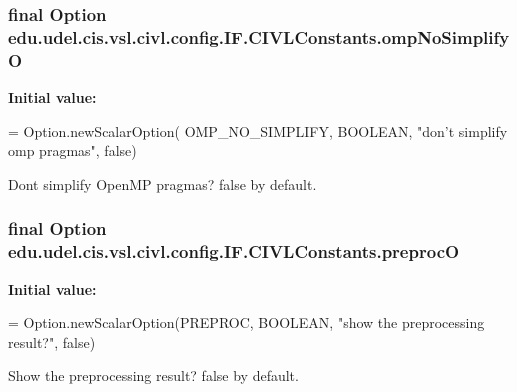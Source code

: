 \subsubsection[{omp\+No\+Simplify\+O}]{\setlength{\rightskip}{0pt plus 5cm}final Option edu.\+udel.\+cis.\+vsl.\+civl.\+config.\+I\+F.\+C\+I\+V\+L\+Constants.\+omp\+No\+Simplify\+O\hspace{0.3cm}{\ttfamily [static]}}\label{classedu_1_1udel_1_1cis_1_1vsl_1_1civl_1_1config_1_1IF_1_1CIVLConstants_aa9db0fc1c94c2a4620214961cb741586}
{\bfseries Initial value\+:}
\begin{DoxyCode}
= Option.newScalarOption(
            OMP\_NO\_SIMPLIFY, BOOLEAN, \textcolor{stringliteral}{"don't simplify omp pragmas"}, \textcolor{keyword}{false})
\end{DoxyCode}


Don\textquotesingle{}t simplify Open\+M\+P pragmas? false by default. 

\hypertarget{classedu_1_1udel_1_1cis_1_1vsl_1_1civl_1_1config_1_1IF_1_1CIVLConstants_ad2ed38186416cf54acb98ebc637afca5}{}
\subsubsection[{preproc\+O}]{\setlength{\rightskip}{0pt plus 5cm}final Option edu.\+udel.\+cis.\+vsl.\+civl.\+config.\+I\+F.\+C\+I\+V\+L\+Constants.\+preproc\+O\hspace{0.3cm}{\ttfamily [static]}}\label{classedu_1_1udel_1_1cis_1_1vsl_1_1civl_1_1config_1_1IF_1_1CIVLConstants_ad2ed38186416cf54acb98ebc637afca5}
{\bfseries Initial value\+:}
\begin{DoxyCode}
= Option.newScalarOption(PREPROC,
            BOOLEAN, \textcolor{stringliteral}{"show the preprocessing result?"}, \textcolor{keyword}{false})
\end{DoxyCode}


Show the preprocessing result? false by default. 

\hypertarget{classedu_1_1udel_1_1cis_1_1vsl_1_1civl_1_1config_1_1IF_1_1CIVLConstants_a8fdd648c7a222f4855d9ed644c818e6f}{}
